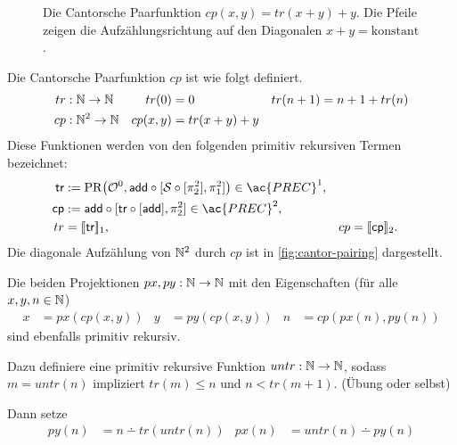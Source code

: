   \begin{figure}[tp]
    \centering
    \caption{Die Cantorsche Paarfunktion
      $cp(x,y)=tr(x+y)+y$. Die Pfeile zeigen die Aufzählungsrichtung auf
      den Diagonalen $x+y=\text{konstant}$.}
    \label{fig:cantor-pairing}
  \end{figure}
\begin{Bsp}
  Die Cantorsche Paarfunktion $cp$ ist wie folgt definiert.
  \begin{align*}
    tr & : \mathbb{N} \to \mathbb{N}  & tr (0) &= 0 & tr(n+1) &= n+1 + tr(n) \\
    cp & : \mathbb{N}^2 \to \mathbb{N} & cp (x, y) &= tr (x+y) + y
  \end{align*}
  Diese Funktionen werden von den folgenden primitiv rekursiven Termen
  bezeichnet:
  \begin{align*}
    \mathsf{tr}
      &:=\PR\bigl(\mathcal{O}^0,
        \mathsf{add}\circ[\mathcal{S}\circ[\pi_2^2],\pi_1^2]\bigr)
      \in\ac{PREC}^1,\\
    \mathsf{cp}
      &:=\mathsf{add}\circ[
        \mathsf{tr}\circ[\mathsf{add}],\pi_2^2]
      \in\ac{PREC}^2,\\
    tr&=\llbracket\mathsf{tr}\rrbracket_1,
      &cp&=\llbracket\mathsf{cp}\rrbracket_2.
  \end{align*}
  Die diagonale Aufzählung von $\mathbb{N}^2$ durch $cp$ ist in
  \autoref{fig:cantor-pairing} dargestellt.


  Die beiden Projektionen $px, py : \mathbb{N} \to \mathbb{N}$ mit den Eigenschaften
  (für alle $x, y, n \in \mathbb{N}$)
  \begin{align*}
    x &= px (cp (x, y)) & y &= py (cp (x, y)) & n & = cp (px (n), py (n))
  \end{align*}
  sind ebenfalls primitiv rekursiv.

  Dazu definiere eine primitiv rekursive Funktion $untr : \mathbb{N} \to \mathbb{N}$,
  sodass $m = untr(n)$ impliziert $tr(m)\le n$ und $n <
  tr(m+1)$. (Übung oder selbst)

  Dann setze
  \begin{align*}
    py (n) &= n \dotminus tr (untr (n)) &
    px (n) &= untr (n) \dotminus py (n)
  \end{align*}

\end{Bsp}

